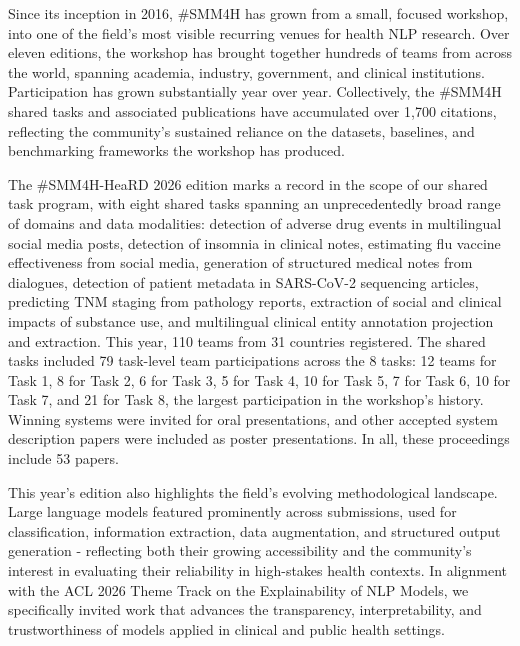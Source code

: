 \documentclass[11pt,oneside]{book}
\begin{document}
Since its inception in 2016, \#SMM4H has grown from a small, focused workshop, into one of the field’s most visible recurring venues for health NLP research. Over eleven editions, the workshop has brought together hundreds of teams from across the world, spanning academia, industry, government, and clinical institutions. Participation has grown substantially year over year. Collectively, the \#SMM4H shared tasks and associated publications have accumulated over 1,700 citations, reflecting the community’s sustained reliance on the datasets, baselines, and benchmarking frameworks the workshop has produced.
\par\vspace{1em}

The \#SMM4H-HeaRD 2026 edition marks a record in the scope of our shared task program, with eight shared tasks spanning an unprecedentedly broad range of domains and data modalities: detection of adverse drug events in multilingual social media posts, detection of insomnia in clinical notes, estimating flu vaccine effectiveness from social media, generation of structured medical notes from dialogues, detection of patient metadata in SARS-CoV-2 sequencing articles, predicting TNM staging from pathology reports, extraction of social and clinical impacts of substance use, and multilingual clinical entity annotation projection and extraction. This year, 110 teams from 31 countries registered. The shared tasks included 79 task-level team participations across the 8 tasks: 12 teams for Task 1, 8 for Task 2, 6 for Task 3, 5 for Task 4, 10 for Task 5, 7 for Task 6, 10 for Task 7, and 21 for Task 8, the largest participation in the workshop's history. Winning systems were invited for oral presentations, and other accepted system description papers were included as poster presentations. In all, these proceedings include 53 papers.

\par\vspace{1em}
This year’s edition also highlights the field’s evolving methodological landscape. Large language models featured prominently across submissions, used for classification, information extraction, data augmentation, and structured output generation - reflecting both their growing accessibility and the community’s interest in evaluating their reliability in high-stakes health contexts. In alignment with the ACL 2026 Theme Track on the Explainability of NLP Models, we specifically invited work that advances the transparency, interpretability, and trustworthiness of models applied in clinical and public health settings.
\end{document}
